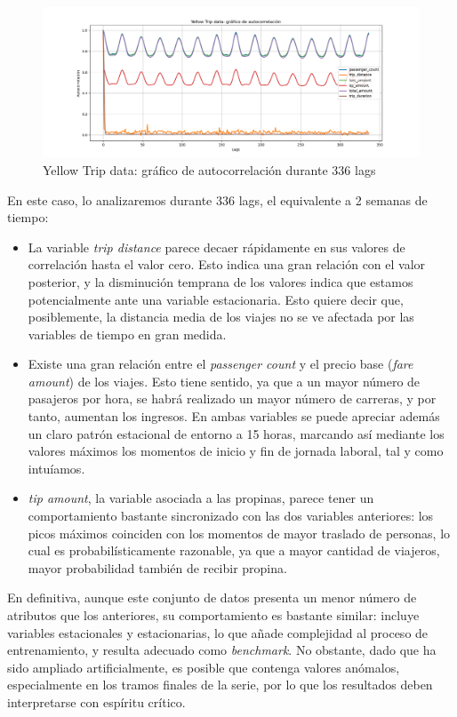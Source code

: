 \begin{figure}[!ht]
	\centering
	\includegraphics[scale=0.4]{img/taxi_autocorrelacion}
	\caption{Yellow Trip data: gráfico de autocorrelación durante 336 lags}
	\label{autotaxi}
\end{figure}
	
En este caso, lo analizaremos durante 336 lags, el equivalente a 2 semanas de tiempo:

\begin{itemize}
	\item La variable \textit{trip distance} parece decaer rápidamente en sus valores de correlación hasta el valor cero. Esto indica una gran relación con el valor posterior, y la disminución temprana de los valores indica que estamos potencialmente ante una variable estacionaria. Esto quiere decir que, posiblemente, la distancia media de los viajes no se ve afectada por las variables de tiempo en gran medida.
	\item Existe una gran relación entre el \textit{passenger count} y el precio base (\textit{fare amount}) de los viajes. Esto tiene sentido, ya que a un mayor número de pasajeros por hora, se habrá realizado un mayor número de carreras, y por tanto, aumentan los ingresos. En ambas variables se puede apreciar además un claro patrón estacional de entorno a 15 horas, marcando así mediante los valores máximos los momentos de inicio y fin de jornada laboral, tal y como intuíamos.
	\item \textit{tip amount}, la variable asociada a las propinas, parece tener un comportamiento bastante sincronizado con las dos variables anteriores: los picos máximos coinciden con los momentos de mayor traslado de personas, lo cual es probabilísticamente razonable, ya que a mayor cantidad de viajeros, mayor probabilidad también de recibir propina.
\end{itemize}

En definitiva, aunque este conjunto de datos presenta un menor número de atributos que los anteriores, su comportamiento es bastante similar: incluye variables estacionales y estacionarias, lo que añade complejidad al proceso de entrenamiento, y resulta adecuado como \textit{benchmark}. No obstante, dado que ha sido ampliado artificialmente, es posible que contenga valores anómalos, especialmente en los tramos finales de la serie, por lo que los resultados deben interpretarse con espíritu crítico.

